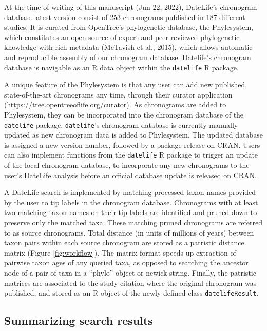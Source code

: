 \documentclass[english,man]{apa6}
\begin{document}
At the time of writing of this manuscript (Jun 22, 2022),
DateLife's chronogram database latest version consist of 253 chronograms published in 187 different studies. It is curated from OpenTree's phylogenetic database, the Phylesystem, which constitutes an open source of expert and peer-reviewed phylogenetic knowledge with rich metadata (McTavish et al., 2015), which allows automatic and reproducible assembly of our chronogram database. Datelife's chronogram database is navigable as an R data object within the \texttt{datelife} R package.

A unique feature of the Phylesystem is that any user can add new published, state-of-the-art chronograms any time, through their curator application (\url{https://tree.opentreeoflife.org/curator}). As chronograms are added to Phylesystem, they can be incorporated into the chronogram database of the \texttt{datelife} package. \texttt{datelife}'s chronogram database is currently manually updated as new chronogram data is added to Phylesystem. The updated database is assigned a new version number, followed by a package release on CRAN.
Users can also implement functions from the \texttt{datelife} R package to trigger an update of the local chronogram database, to incorporate any new chronograms to the user's DateLife analysis before an official database update is released on CRAN.

A DateLife search is implemented by matching processed taxon names provided by the user to tip labels in the chronogram database. Chronograms with at least two matching taxon names on their tip labels are identified and pruned down to preserve only the matched taxa.
These matching pruned chronograms are referred to as source chronograms.
Total distance (in units of millions of years) between taxon pairs within each source chronogram are stored as a patristic distance matrix (Figure \ref{fig:workflow}).
The matrix format speeds up extraction of pairwise taxon ages of any queried taxa, as opposed to searching the ancestor node of a pair of taxa in a \enquote{phylo} object or newick string.
Finally, the patristic matrices are associated to the study citation where the original chronogram was published, and stored as an R object of the newly defined class \texttt{datelifeResult}.

\hypertarget{summarizing-search-results}{%
\subsection{Summarizing search results}\label{summarizing-search-results}}
\end{document}
